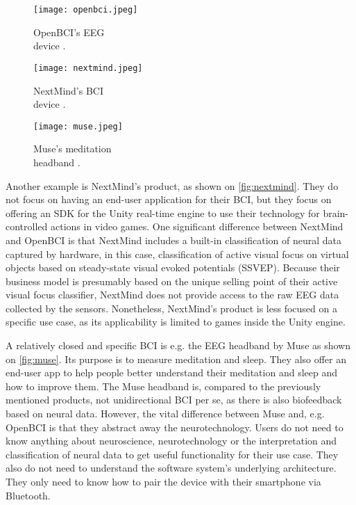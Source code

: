 \begin{figure}[!ht]
  \texttt{[image: openbci.jpeg]}
  \caption{OpenBCI's EEG \\ device \citep{be_superhvman_conor_2017}.}
  \label{fig:openbci}
  \endminipage\hfill
  \texttt{[image: nextmind.jpeg]}
  \caption{NextMind's BCI \\ device \citep{louise_neurotechnology_2019}.}
  \label{fig:nextmind}
  \endminipage\hfill
  \texttt{[image: muse.jpeg]}
  \caption{Muse's meditation \\ headband \citep{muse_muse_nodate}.}
  \label{fig:muse}
  \endminipage
\end{figure}

Another example is NextMind's product, as shown on \autoref{fig:nextmind}. They do not focus on having an end-user application for their BCI, but they focus on offering an SDK for the Unity real-time engine to use their technology for brain-controlled actions in video games. One significant difference between NextMind and OpenBCI is that NextMind includes a built-in classification of neural data captured by hardware, in this case, classification of active visual focus on virtual objects based on steady-state visual evoked potentials (SSVEP). Because their business model is presumably based on the unique selling point of their active visual focus classifier, NextMind does not provide access to the raw EEG data collected by the sensors. Nonetheless, NextMind's product is less focused on a specific use case, as its applicability is limited to games inside the Unity engine.

A relatively closed and specific BCI is e.g. the EEG headband by Muse as shown on \autoref{fig:muse}. Its purpose is to measure meditation and sleep. They also offer an end-user app to help people better understand their meditation and sleep and how to improve them. The Muse headband is, compared to the previously mentioned products, not unidirectional BCI per se, as there is also biofeedback based on neural data. However, the vital difference between Muse and, e.g. OpenBCI is that they abstract away the neurotechnology. Users do not need to know anything about neuroscience, neurotechnology or the interpretation and classification of neural data to get useful functionality for their use case. They also do not need to understand the software system's underlying architecture. They only need to know how to pair the device with their smartphone via Bluetooth.

